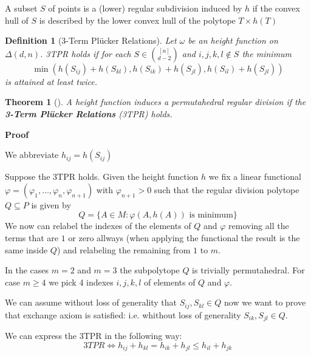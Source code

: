 \documentclass{myclass}
\newtheorem*{definition}{Definition}
\newtheorem*{theorem}{Theorem}
\begin{document}
A subset $S$ of points is a (lower) regular subdivision induced by $h$ if the convex hull of $S$ is described by the lower convex hull of the polytope $T\times h(T)$ 

\begin{definition}[3-Term Plücker Relations] Let $\omega $ be an height function on $\Delta(d, n)$.
3TPR holds if for each $S\in \binom{[n]}{ d-2}$ and $i, j, k, l \not\in S$ the minimum
\[
\min (h(S_{ij}) + h(S_{kl}), h(S_{ik}) + h(S_{jl}), h(S_{il}) +  h(S_{jl}))
\] 
is attained at least twice.
\end{definition}

\begin{theorem}[] A height function induces a permutahedral regular division if the \textbf{3-Term Plücker Relations} (3TPR) holds.
\end{theorem}


\textbf{Proof}

We abbreviate $h_{ij} = h(S_{ij})$

Suppose the 3TPR holds. Given the height function $h$ we fix a linear functional $\varphi = (\varphi _1, \ldots, \varphi _n, \varphi _{n+1})$ with $\varphi _{n+1}>0$ such that the regular division polytope $Q\subseteq P$ is given by
\[
Q = \{A\in M : \varphi (A, h(A)) \text{ is minimum}\}
\] 
We now can relabel the indexes of the elements of $Q$ and $\varphi $ removing all the terms that are $1$ or zero allways (when applying the functional the result is the same inside $Q$) and relabeling the remaining from $1$ to  $m$.

In the cases $m = 2$ and  $m=3$ the subpolytope $Q$ is trivially permutahedral. For case $m\ge 4$ we pick 4 indexes $i, j, k, l$ of elements of $Q$ and $\varphi $. 

We can assume without loss of generality that $S_{ij}, S_{kl} \in Q$ now we want to prove that exchange axiom is satisfied: i.e. whithout loss of generality $S_{ik}, S_{jl}\in Q$.

We can express the 3TPR in the following way:
\[
  3TPR \iff h_{ij} + h_{kl} = h_{ik} + h_{jl}\le h_{il} + h_{jk}
\] 
\end{document}

